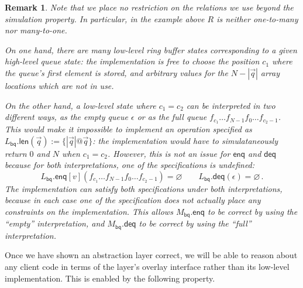 \documentclass[11pt,oneside,draft]{book}
\newtheorem{remark}[theorem]{Remark}
\theoremstyle{definition}
\newcommand{\kw}[1]{\ensuremath{ \mathsf{#1} }}
\begin{document}
\begin{remark} %
Note that we place no restriction
on the relations we use
beyond the simulation property.
In particular, in the example above
$R$ is neither one-to-many nor many-to-one.

On one hand,
there are many low-level ring buffer states corresponding to
a given high-level queue state:
the implementation is free to choose the position $c_1$
where the queue's first element is stored,
and arbitrary values for the $N - |\vec{q}|$
array locations which are not in use.

On the other hand,
a low-level state where $c_1 = c_2$
can be interpreted in two different ways,
as the empty queue $\epsilon$ or
as the full queue $f_{c_1} \ldots f_{N-1} f_0 \ldots f_{c_2 - 1}$.
This would make it impossible to implement
an operation specified as
$L_\kw{bq}.\kw{len}(\vec{q}) := \{ |\vec{q}|@\vec{q} \}$:
the implementation
would have to simulataneously
return $0$ and $N$
when $c_1 = c_2$.
However,
this is not an issue for $\kw{enq}$ and $\kw{deq}$ because
for both interpretations,
one of the specifications is undefined:
\[
  L_\kw{bq}.\kw{enq}[v](f_{c_1} \ldots f_{N-1} f_0 \ldots f_{c_2 - 1})
  =
  \varnothing
  \qquad
  L_\kw{bq}.\kw{deq}(\epsilon)
  =
  \varnothing
  \,.
\]
The implementation can satisfy both specifications
under both interpretations,
because in each case one of
the specification does not actually place
any constraints on the implementation.
This allows
$M_\kw{bq}.\kw{enq}$ to be correct
by using the ``empty'' interpretation, and
$M_\kw{bq}.\kw{deq}$ to be correct
by using the ``full'' interpretation.
\end{remark}

Once we have shown an abstraction layer correct,
we will be able to reason about any client code
in terms of the layer's overlay interface
rather than its low-level implementation.
This is enabled by the following property.
\end{document}
